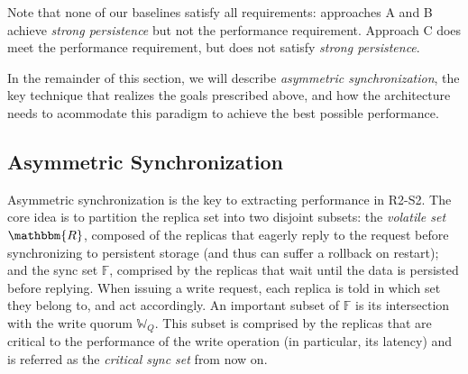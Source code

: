 Note that none of our baselines satisfy all requirements:
approaches A and B achieve
\emph{strong persistence} but not the performance requirement.
Approach C does meet the performance
requirement, but does not satisfy \emph{strong persistence}.

In the remainder of this section, we will describe
\emph{asymmetric synchronization}, the key technique that realizes the
goals prescribed above, and how the architecture needs to
acommodate this paradigm to achieve the best possible
performance.

\subsection{Asymmetric Synchronization}\label{ssec:asymmetric_synchronization}

Asymmetric synchronization is the key to extracting performance
in \ac{R2-S2}. The core idea is to partition the replica set
into two disjoint subsets: the \emph{volatile set}
$\mathbbm{R}$, composed of the replicas that eagerly reply to the
request before synchronizing to persistent storage (and thus can
suffer a rollback on restart); and the sync set $\mathbb{F}$,
comprised by the
replicas that wait until the data is persisted before replying.
When issuing a write request, each replica is told in which set
they belong to, and act accordingly. An important subset of
$\mathbb{F}$ is its intersection with the write quorum
$\mathbb{W}_Q$. This subset is comprised by the replicas that are
critical to the performance of the write operation (in
particular, its latency) and is referred as the \emph{critical
sync set} from now on. 

